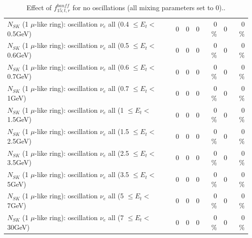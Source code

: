 \begin{table}
\begin{tabular}{| l | r | r | r  r | r  r |}
$N_{SK}$ (1 $\mu$-like ring): oscillation $\nu_{e}$ all (0.4 $\leq E_{t} <$ 0.5GeV) &               0 &               0 &               0 &        0 \%  &               0 &        0 \%  \\ 
$N_{SK}$ (1 $\mu$-like ring): oscillation $\nu_{e}$ all (0.5 $\leq E_{t} <$ 0.6GeV) &               0 &               0 &               0 &        0 \%  &               0 &        0 \%  \\ 
$N_{SK}$ (1 $\mu$-like ring): oscillation $\nu_{e}$ all (0.6 $\leq E_{t} <$ 0.7GeV) &               0 &               0 &               0 &        0 \%  &               0 &        0 \%  \\ 
$N_{SK}$ (1 $\mu$-like ring): oscillation $\nu_{e}$ all (0.7 $\leq E_{t} <$ 1GeV) &               0 &               0 &               0 &        0 \%  &               0 &        0 \%  \\ 
$N_{SK}$ (1 $\mu$-like ring): oscillation $\nu_{e}$ all (1 $\leq E_{t} <$ 1.5GeV) &               0 &               0 &               0 &        0 \%  &               0 &        0 \%  \\ 
$N_{SK}$ (1 $\mu$-like ring): oscillation $\nu_{e}$ all (1.5 $\leq E_{t} <$ 2.5GeV) &               0 &               0 &               0 &        0 \%  &               0 &        0 \%  \\ 
$N_{SK}$ (1 $\mu$-like ring): oscillation $\nu_{e}$ all (2.5 $\leq E_{t} <$ 3.5GeV) &               0 &               0 &               0 &        0 \%  &               0 &        0 \%  \\ 
$N_{SK}$ (1 $\mu$-like ring): oscillation $\nu_{e}$ all (3.5 $\leq E_{t} <$ 5GeV) &               0 &               0 &               0 &        0 \%  &               0 &        0 \%  \\ 
 $N_{SK}$ (1 $\mu$-like ring): oscillation $\nu_{e}$ all (5 $\leq E_{t} <$ 7GeV) &               0 &               0 &               0 &        0 \%  &               0 &        0 \%  \\ 
$N_{SK}$ (1 $\mu$-like ring): oscillation $\nu_{e}$ all (7 $\leq E_{t} <$ 30GeV) &               0 &               0 &               0 &        0 \%  &               0 &        0 \%  \\ 
\hline
\hline
\end{tabular}
\caption{ Effect of $f_{15; t, r}^{banff}$ for no oscillations (all mixing parameters set to 0).. }
\label{tab:num_banff_15_1RmuT_3f_osc_t13:0}
\end{table}
\clearpage
